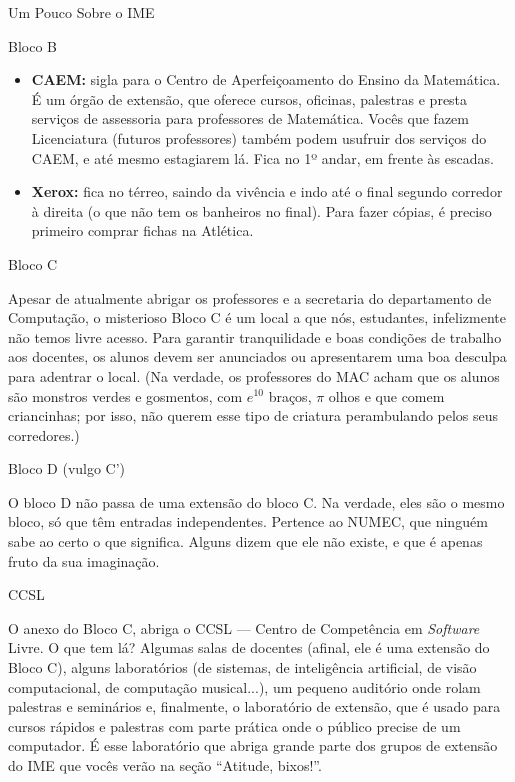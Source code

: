 \begin{secao}{Um Pouco Sobre o IME}
\begin{subsecao}{Bloco B}
\begin{itemize}
\item {\bf CAEM:} sigla para o Centro de Aperfeiçoamento do Ensino da
  Matemática. É um órgão de extensão, que oferece cursos, oficinas, palestras e
  presta serviços de assessoria para professores de Matemática. Vocês que fazem
  Licenciatura (futuros professores) também podem usufruir dos serviços do CAEM,
  e até mesmo estagiarem lá. Fica no 1º andar, em frente às escadas.

\item{\bf Xerox:} fica no térreo, saindo da vivência e indo até o final segundo
  corredor à direita (o que não tem os banheiros no final). Para fazer cópias,
  é preciso primeiro comprar fichas na Atlética.
\end{itemize}

\end{subsecao}

\begin{subsecao}{Bloco C}

Apesar de atualmente abrigar os professores e a secretaria do departamento de
Computação, o misterioso Bloco C é um local a que nós, estudantes, infelizmente não
temos livre acesso. Para garantir tranquilidade e boas condições de trabalho aos
docentes, os alunos devem ser anunciados ou apresentarem uma boa desculpa para
adentrar o local. (Na verdade, os professores do MAC acham que os alunos são monstros
verdes e gosmentos, com $e^{10}$ braços, $\pi$ olhos e que comem criancinhas;
por isso, não querem esse tipo de criatura perambulando pelos seus corredores.)

\end{subsecao}

\begin{subsecao}{Bloco D (vulgo C')}

O bloco D não passa de uma extensão do bloco C. Na verdade, eles são o mesmo bloco,
só que têm entradas independentes. Pertence ao NUMEC, que ninguém sabe ao certo
o que significa. Alguns dizem que ele não existe, e que é apenas fruto da sua
imaginação.

\end{subsecao}

\begin{subsecao}{CCSL}

O anexo do Bloco C, abriga o CCSL --- Centro de Competência em \textit{Software}
Livre. O que tem lá? Algumas salas de docentes (afinal, ele é uma extensão do
Bloco C), alguns laboratórios (de sistemas, de inteligência artificial,
de visão computacional, de computação musical...), um pequeno auditório
onde rolam palestras e seminários e, finalmente, o laboratório de extensão,
que é usado para cursos rápidos e palestras com parte prática onde o público
precise de um computador. É esse laboratório que abriga grande parte dos grupos
de extensão do IME que vocês verão na seção ``Atitude, bixos!''.


\end{subsecao}
\end{secao}

